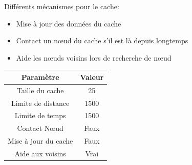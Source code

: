 \documentclass{beamer}
\begin{document}
  \begin{frame}	
  \end{frame}

  \begin{frame}


  \end{frame}

  \begin{frame}
	Différents mécanismes pour le cache:
	\begin{itemize}
		\item Mise à jour des données du cache
		\item Contact un nœud du cache s'il est là depuis longtemps
		\item Aide les nœuds voisins lors de recherche de nœud	
	\end{itemize}
	\footnotesize{
	\begin{table}[!h]
  	\begin{center}
    	\begin{tabular}{|c|c|}
        \hline
      	 Paramètre & Valeur\\
      	\hline
     	 Taille du cache & 25\\
     	 Limite de distance &  1500\\
     	 Limite de temps & 1500\\
     	 Contact Nœud & Faux\\
     	 Mise à jour du cache & Faux\\
     	 Aide aux voisins & Vrai\\
      	\hline
    	\end{tabular}
  	\end{center}
	\end{table}
	}
  \end{frame}
\end{document}
